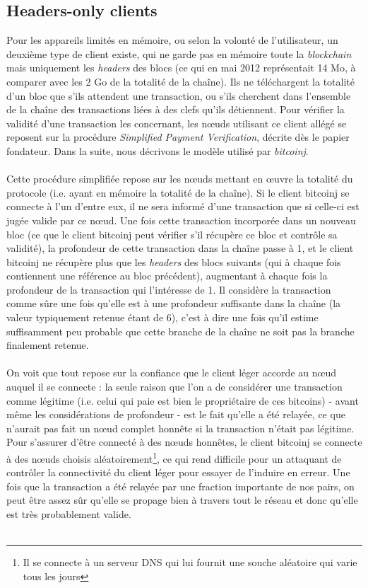 \documentclass[11pt,a4paper]{article}
\begin{document}
\subsection{Headers-only clients}
Pour les appareils limités en mémoire, ou selon la volonté de l'utilisateur, un deuxième type de client existe, qui ne garde pas en mémoire toute la \textit{blockchain} mais uniquement les \textit{headers} des blocs (ce qui en mai 2012 représentait 14 Mo, à comparer avec les 2 Go de la totalité de la chaîne). Ils ne téléchargent la totalité d'un bloc que s'ils attendent une transaction, ou s'ils cherchent dans l'ensemble de la chaîne des transactions liées à des clefs qu'ils détiennent. Pour vérifier la validité d'une transaction les concernant, les n\oe{}uds utilisant ce client allégé se reposent sur la procédure \textit{Simplified Payment Verification}, décrite dès le papier fondateur. Dans la suite, nous décrivons le modèle utilisé par \textit{bitcoinj}.\\\\
Cette procédure simplifiée repose sur les n\oe{}uds mettant en \oe{}uvre la totalité du protocole (i.e. ayant en mémoire la totalité de la chaîne). Si le client bitcoinj se connecte à l'un d'entre eux, il ne sera informé d'une transaction que si celle-ci est jugée valide par ce n\oe{}ud. Une fois cette transaction incorporée dans un nouveau bloc (ce que le client bitcoinj peut vérifier s'il récupère ce bloc et contrôle sa validité), la profondeur de cette transaction dans la chaîne passe à 1, et le client bitcoinj ne récupère plus que les \textit{headers} des blocs suivants (qui à chaque fois contiennent une référence au bloc précédent), augmentant à chaque fois la profondeur de la transaction qui l'intéresse de 1. Il considère la transaction comme sûre une fois qu'elle est à une profondeur suffisante dans la chaîne (la valeur typiquement retenue étant de 6), c'est à dire une fois qu'il estime suffisamment peu probable que cette branche de la chaîne ne soit pas la branche finalement retenue.\\\\
On voit que tout repose sur la confiance que le client léger accorde au n\oe{}ud auquel il se connecte : la seule raison que l'on a de considérer une transaction comme légitime (i.e. celui qui paie est bien le propriétaire de ces bitcoins) - avant même les considérations de profondeur - est le fait qu'elle a été relayée, ce que n'aurait pas fait un n\oe{}ud complet honnête si la transaction n'était pas légitime. Pour s'assurer d'être connecté à des n\oe{}uds honnêtes, le client bitcoinj se connecte à des n\oe{}uds choisis aléatoirement\footnote{Il se connecte à un serveur DNS qui lui fournit une souche aléatoire qui varie tous les jours}, ce qui rend difficile pour un attaquant de contrôler la connectivité du client léger pour essayer de l'induire en erreur. Une fois que la transaction a été relayée par une fraction importante de nos pairs, on peut être assez sûr qu'elle se propage bien à travers tout le réseau et donc qu'elle est très probablement valide. \\\\
\end{document}
